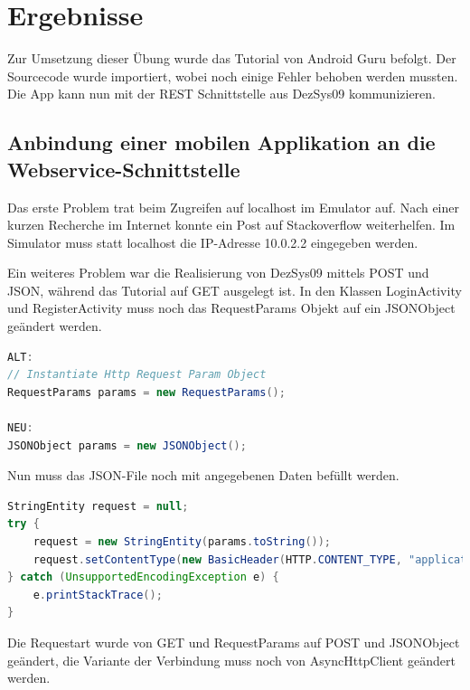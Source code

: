 
\section{Ergebnisse}
\label{sec:Ergebnisse}
Zur Umsetzung dieser Übung wurde das Tutorial von Android Guru befolgt. Der Sourcecode wurde importiert, wobei noch einige Fehler behoben werden mussten. Die App kann nun mit der REST Schnittstelle aus DezSys09 kommunizieren. \cite{GitHub-Repo09}

\subsection{Anbindung einer mobilen Applikation an die Webservice-Schnittstelle}
\label{subsec:Anbindung einer mobilen Applikation an die Webservice-Schnittstelle}
Das erste Problem trat beim Zugreifen auf localhost im Emulator auf. Nach einer kurzen Recherche im Internet konnte ein Post auf Stackoverflow weiterhelfen. \cite{AndroidLocalhost}
Im Simulator muss statt localhost die IP-Adresse 10.0.2.2 eingegeben werden.

Ein weiteres Problem war die Realisierung von DezSys09 mittels POST und JSON, während das Tutorial auf GET ausgelegt ist. In den Klassen LoginActivity und RegisterActivity muss noch das RequestParams Objekt auf ein JSONObject geändert werden.

\begin{lstlisting}[frame=single, language=java, caption=Ändern des RequestParams Objekts auf ein JSONObject]
ALT:
// Instantiate Http Request Param Object
RequestParams params = new RequestParams();

NEU:
JSONObject params = new JSONObject();
\end{lstlisting}

Nun muss das JSON-File noch mit angegebenen Daten befüllt werden.
\begin{lstlisting}[frame=single, language=java, caption=Ändern des RequestParams Objekts auf ein JSONObject]
StringEntity request = null;
try {
	request = new StringEntity(params.toString());
	request.setContentType(new BasicHeader(HTTP.CONTENT_TYPE, "application/json"));
} catch (UnsupportedEncodingException e) {
	e.printStackTrace();
}
\end{lstlisting}

Die Requestart wurde von GET und RequestParams auf POST und JSONObject geändert, die Variante der Verbindung muss noch von AsyncHttpClient geändert werden.

